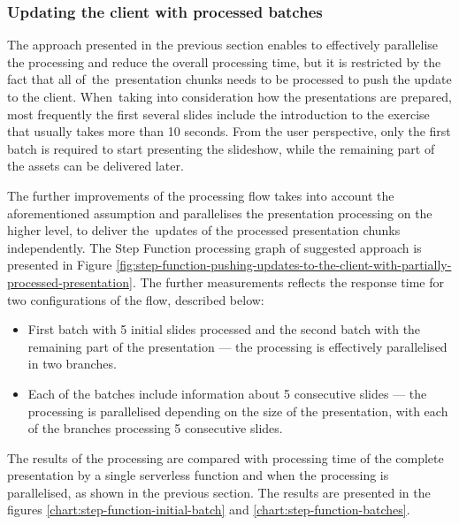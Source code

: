 \subsubsection{Updating the client with processed batches} \label{section:case-study-updating-the-client-with-processed-batch}

The approach presented in the previous section enables to effectively parallelise the processing and reduce the overall processing time, but it is restricted by the fact that all of~the~presentation chunks needs to be processed to push the update to the client. When~taking into consideration how the presentations are prepared, most frequently the first several slides include the introduction to the exercise that usually takes more than 10 seconds. From the user perspective, only the first batch is required to start presenting the slideshow, while the remaining part of the assets can be delivered later.

The further improvements of the processing flow takes into account the aforementioned assumption and parallelises the presentation processing on the higher level, to deliver the~updates of the processed presentation chunks independently. The Step Function processing graph of suggested approach is presented in Figure \ref{fig:step-function-pushing-updates-to-the-client-with-partially-processed-presentation}. The further measurements reflects the response time for two configurations of the flow, described below:

\begin{itemize}
   \item First batch with 5 initial slides processed and the second batch with the remaining part of the presentation --- the processing is effectively parallelised in two branches.
   \item Each of the batches include information about 5 consecutive slides --- the processing is parallelised depending on the size of the presentation, with each of the branches processing 5 consecutive slides.
\end{itemize}

The results of the processing are compared with processing time of the complete presentation by a single serverless function and when the processing is parallelised, as shown in the previous section. The results are presented in the figures \ref{chart:step-function-initial-batch} and \ref{chart:step-function-batches}.

